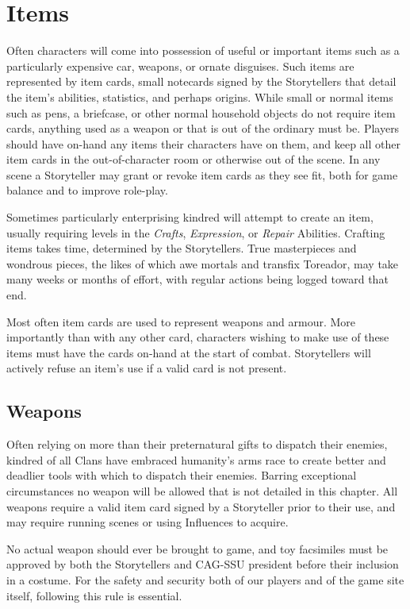 \section{Items}
\label{sec:items}
Often characters will come into possession of useful or important items such 
as a particularly expensive car, weapons, or ornate disguises.  Such items 
are represented by item cards, small notecards signed by the Storytellers that 
detail the item's abilities, statistics, and perhaps origins.  While small 
or normal items such as pens, a briefcase, or other normal household objects 
do not require item cards, anything used as a weapon or that is out of the 
ordinary must be.  Players should have on-hand any items their characters have 
on them, and keep all other item cards in the out-of-character room or otherwise 
out of the scene.  In any scene a Storyteller may grant or revoke item cards as 
they see fit, both for game balance and to improve role-play.  

Sometimes particularly enterprising kindred will attempt to create an item, 
usually requiring levels in the \emph{Crafts}, \emph{Expression}, or 
\emph{Repair} Abilities.  Crafting items takes time, determined by the 
Storytellers.  True masterpieces and wondrous pieces, the likes of which 
awe mortals and transfix Toreador, may take many weeks or months of effort, 
with regular actions being logged toward that end.

Most often item cards are used to represent weapons and armour.  More importantly 
than with any other card, characters wishing to make use of these items must have 
the cards on-hand at the start of combat.  Storytellers will actively refuse an 
item's use if a valid card is not present.

\subsection{Weapons}

Often relying on more than their preternatural gifts to dispatch their enemies, kindred 
of all Clans have embraced humanity's arms race to create better and deadlier tools with 
which to dispatch their enemies.  Barring exceptional circumstances no weapon will be 
allowed that is not detailed in this chapter.  All weapons require a valid item card 
signed by a Storyteller prior to their use, and may require running scenes or using Influences 
to acquire.

No actual weapon should ever be brought to game, and toy facsimiles must be approved by both 
the Storytellers and CAG-SSU president before their inclusion in a costume.  For the safety and 
security both of our players and of the game site itself, following this rule is essential.


